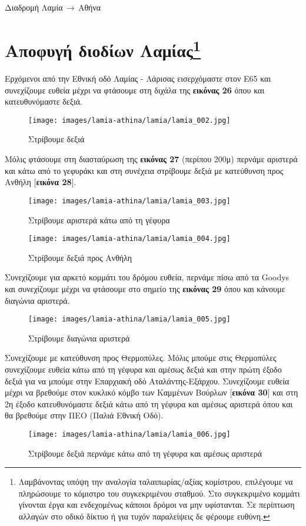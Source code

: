 \begin{center}
\begin{huge}
Διαδρομή Λαμία$\,\to\,$Αθήνα
\end{huge}
\section*{Αποφυγή διοδίων Λαμίας\footnote{Λαμβάνοντας υπόψη την αναλογία ταλαιπωρίας/αξίας κομίστρου, επιλέγουμε να πληρώσουμε το κόμιστρο του συγκεκριμένου σταθμού. Στο συγκεκριμένο κομμάτι γίνονται έργα και ενδεχομένως κάποιοι δρόμοι να μην υφίστανται. Σε περίπτωση αλλαγών στο οδικό δίκτυο ή για τυχόν παραλείψεις δε φέρουμε ευθύνη.}}
\end{center}
Ερχόμενοι από την Εθνική οδό Λαμίας - Λάρισας εισερχόμαστε στον Ε65 και συνεχίζουμε ευθεία μέχρι να φτάσουμε στη διχάλα της \textbf{εικόνας 26} όπου και κατευθυνόμαστε δεξιά.
 
\begin{figure}[H]
\texttt{[image: images/lamia-athina/lamia/lamia\_002.jpg]} 
\caption{Στρίβουμε δεξιά} 
\end{figure}

Μόλις φτάσουμε στη διασταύρωση της \textbf{εικόνας 27} (περίπου 200μ) περνάμε αριστερά και κάτω από το γεφυράκι και στη συνέχεια στρίβουμε δεξιά με κατεύθυνση προς Ανθήλη [\textbf{εικόνα 28}]. 
\begin{figure}[H]
\texttt{[image: images/lamia-athina/lamia/lamia\_003.jpg]}
\caption{Στρίβουμε αριστερά κάτω από τη γέφυρα}
\end{figure}
\begin{figure}[H]  
\texttt{[image: images/lamia-athina/lamia/lamia\_004.jpg]} 
\caption{Στρίβουμε δεξιά προς Ανθήλη} 
\end{figure}

Συνεχίζουμε για αρκετό κομμάτι του δρόμου ευθεία, περνάμε πίσω από τα Goodys και συνεχίζουμε μέχρι να φτάσουμε στο σημείο της \textbf{εικόνας 29} όπου και κάνουμε διαγώνια αριστερά. 
\begin{figure}[H]
\texttt{[image: images/lamia-athina/lamia/lamia\_005.jpg]}
\caption{Στρίβουμε διαγώνια αριστερά} 
\end{figure}

Συνεχίζουμε με κατεύθυνση προς Θερμοπύλες. Μόλις μπούμε στις Θερμοπύλες συνεχίζουμε ευθεία κάτω από τη γέφυρα και αμέσως δεξιά και στην πρώτη έξοδο δεξιά για να μπούμε στην Επαρχιακή οδό Αταλάντης-Εξάρχου. Συνεχίζουμε ευθεία μέχρι να βρεθούμε στον κυκλικό κόμβο των Καμμένων Βούρλων [\textbf{εικόνα 30}] και στη 2η έξοδο κατευθυνόμαστε δεξιά κάτω από τη γέφυρα και αμέσως αριστερά όπου και θα βρεθούμε στην ΠΕΟ (Παλιά Εθνική Οδό).
\begin{figure}[H]
\texttt{[image: images/lamia-athina/lamia/lamia\_006.jpg]}
\caption{Στρίβουμε δεξιά περνάμε κάτω από τη γέφυρα και αμέσως αριστερά}  
\end{figure}

